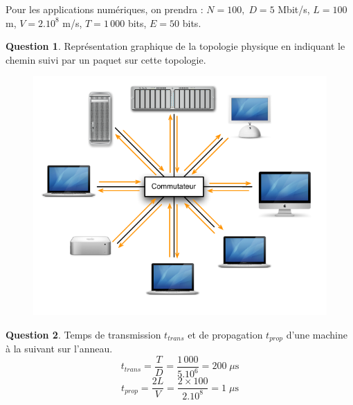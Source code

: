 \documentclass[11pt,english,french]{scrreprt}
\theoremstyle{remark}
\theoremstyle{definition}
\newtheorem{ques}{Question}[section]
\begin{document}
Pour les applications numériques, on prendra : $N=100,\;D=5$ Mbit/s, $L=100$ m, $V=2.10^8$ m/s, $T=1\,000$ bits, $E=50$ bits.

\begin{ques}
	Représentation graphique de la topologie physique en indiquant le chemin suivi par un paquet sur cette topologie.
	\begin{figure}[h]
		\center
		\includegraphics[scale=.8]{Exam2009/etoile-phy}
	\end{figure}
\end{ques}

\begin{ques}
	Temps de transmission $t_{trans}$ et de propagation $t_{prop}$ d'une machine à la suivant sur l'anneau.
	\[t_{trans} = \frac{T}{D}=\frac{1\,000}{5.10^6}=200\;\mu\textrm{s}\]
	\[t_{prop} = \frac{2L}{V} = \frac{2\times 100}{2.10^8}=1\;\mu\textrm{s}\]
\end{ques}
\end{document}
